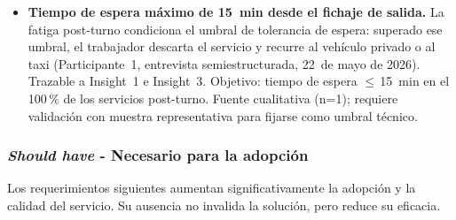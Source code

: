 \begin{itemize}
	\item \textbf{Tiempo de espera máximo de 15~min desde el fichaje
	de salida.} La fatiga post-turno condiciona el umbral de tolerancia
	de espera: superado ese umbral, el trabajador descarta el servicio
	y recurre al vehículo privado o al taxi (Participante~1, entrevista
	semiestructurada, 22~de mayo de 2026). Trazable a Insight~1 e Insight~3.
	Objetivo: tiempo de espera $\leq$\,15~min en el 100\,\% de los
	servicios post-turno. Fuente cualitativa (n=1); requiere validación
	con muestra representativa para fijarse como umbral técnico.

\end{itemize}

\subsubsection{\textit{Should have} - Necesario para la adopción}
\label{sec:moscow-should}

Los requerimientos siguientes aumentan significativamente la adopción
y la calidad del servicio. Su ausencia no invalida la solución, pero
reduce su eficacia.

